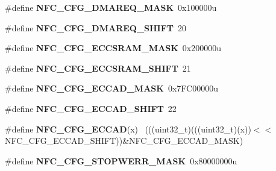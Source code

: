 \begin{DoxyCompactItemize}
\item 
\hypertarget{group___n_f_c___register___masks_gabae2501177f466efc5a42232973a5a97}{}\#define {\bfseries N\+F\+C\+\_\+\+C\+F\+G\+\_\+\+D\+M\+A\+R\+E\+Q\+\_\+\+M\+A\+S\+K}~0x100000u\label{group___n_f_c___register___masks_gabae2501177f466efc5a42232973a5a97}

\item 
\hypertarget{group___n_f_c___register___masks_ga97de46a19b031b429b4dd853aaf97a94}{}\#define {\bfseries N\+F\+C\+\_\+\+C\+F\+G\+\_\+\+D\+M\+A\+R\+E\+Q\+\_\+\+S\+H\+I\+F\+T}~20\label{group___n_f_c___register___masks_ga97de46a19b031b429b4dd853aaf97a94}

\item 
\hypertarget{group___n_f_c___register___masks_ga70faa6a0122279a0874e723d7600a3bf}{}\#define {\bfseries N\+F\+C\+\_\+\+C\+F\+G\+\_\+\+E\+C\+C\+S\+R\+A\+M\+\_\+\+M\+A\+S\+K}~0x200000u\label{group___n_f_c___register___masks_ga70faa6a0122279a0874e723d7600a3bf}

\item 
\hypertarget{group___n_f_c___register___masks_gaf18ba72579a6831aad63a5982e7c088c}{}\#define {\bfseries N\+F\+C\+\_\+\+C\+F\+G\+\_\+\+E\+C\+C\+S\+R\+A\+M\+\_\+\+S\+H\+I\+F\+T}~21\label{group___n_f_c___register___masks_gaf18ba72579a6831aad63a5982e7c088c}

\item 
\hypertarget{group___n_f_c___register___masks_ga894964e05a2a9317bad0d90c4384309f}{}\#define {\bfseries N\+F\+C\+\_\+\+C\+F\+G\+\_\+\+E\+C\+C\+A\+D\+\_\+\+M\+A\+S\+K}~0x7\+F\+C00000u\label{group___n_f_c___register___masks_ga894964e05a2a9317bad0d90c4384309f}

\item 
\hypertarget{group___n_f_c___register___masks_ga1bb9051138a32b8a0c1796f6cc0c01a0}{}\#define {\bfseries N\+F\+C\+\_\+\+C\+F\+G\+\_\+\+E\+C\+C\+A\+D\+\_\+\+S\+H\+I\+F\+T}~22\label{group___n_f_c___register___masks_ga1bb9051138a32b8a0c1796f6cc0c01a0}

\item 
\hypertarget{group___n_f_c___register___masks_ga41bb6229d5a15ce4a84e307c2197ee2c}{}\#define {\bfseries N\+F\+C\+\_\+\+C\+F\+G\+\_\+\+E\+C\+C\+A\+D}(x)                                              ~(((uint32\+\_\+t)(((uint32\+\_\+t)(x))$<$$<$N\+F\+C\+\_\+\+C\+F\+G\+\_\+\+E\+C\+C\+A\+D\+\_\+\+S\+H\+I\+F\+T))\&N\+F\+C\+\_\+\+C\+F\+G\+\_\+\+E\+C\+C\+A\+D\+\_\+\+M\+A\+S\+K)\label{group___n_f_c___register___masks_ga41bb6229d5a15ce4a84e307c2197ee2c}

\item 
\hypertarget{group___n_f_c___register___masks_gadfa83b442ebbf83d19c55445745fd077}{}\#define {\bfseries N\+F\+C\+\_\+\+C\+F\+G\+\_\+\+S\+T\+O\+P\+W\+E\+R\+R\+\_\+\+M\+A\+S\+K}~0x80000000u\label{group___n_f_c___register___masks_gadfa83b442ebbf83d19c55445745fd077}


\end{DoxyCompactItemize}
